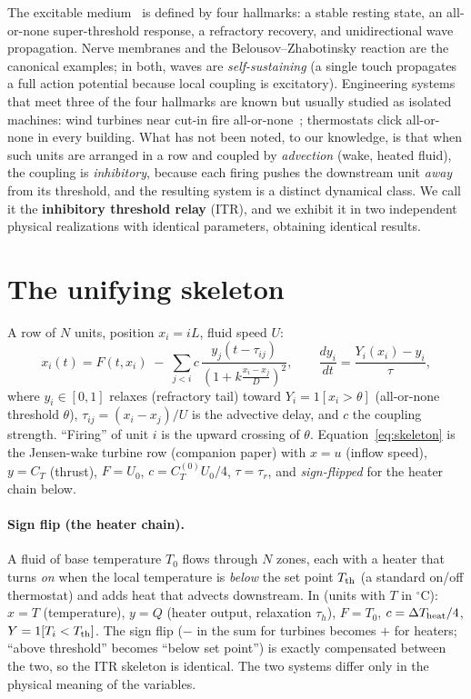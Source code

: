 \documentclass[11pt]{article}
\begin{document}
The excitable medium~\cite{HodgkinHuxley1952,FitzHugh1961} is defined by four hallmarks: a
stable resting state, an all-or-none super-threshold response, a refractory recovery, and
unidirectional wave propagation. Nerve membranes and the Belousov--Zhabotinsky reaction are
the canonical examples; in both, waves are \emph{self-sustaining} (a single touch propagates
a full action potential because local coupling is excitatory). Engineering systems that meet
three of the four hallmarks are known but usually studied as isolated machines: wind turbines
near cut-in fire all-or-none~\cite{Howland2019}; thermostats click all-or-none in every
building. What has not been noted, to our knowledge, is that when such units are arranged in
a row and coupled by \emph{advection} (wake, heated fluid), the coupling is
\emph{inhibitory}, because each firing pushes the downstream unit \emph{away} from its threshold, and the resulting system is a distinct dynamical class. We call it the
\textbf{inhibitory threshold relay} (ITR), and we exhibit it in two independent physical
realizations with identical parameters, obtaining identical results.

\section{The unifying skeleton}

A row of $N$ units, position $x_i=iL$, fluid speed $U$:
\begin{equation}
x_i(t) = F(t,x_i) \;-\; \sum_{j<i} c\,\frac{y_j\!\left(t-\tau_{ij}\right)}{\left(1+k\frac{x_i-x_j}{D}\right)^2},
\qquad \frac{dy_i}{dt} = \frac{Y_i(x_i)-y_i}{\tau},
\label{eq:skeleton}
\end{equation}
where $y_i \in [0,1]$ relaxes (refractory tail) toward $Y_i = 1[x_i > \theta]$ (all-or-none
threshold $\theta$), $\tau_{ij}=(x_i-x_j)/U$ is the advective delay, and $c$ the coupling
strength. ``Firing'' of unit $i$ is the upward crossing of $\theta$. Equation~\eqref{eq:skeleton}
is the Jensen-wake turbine row (companion paper) with $x=u$ (inflow speed), $y=C_T$ (thrust),
$F = U_0$, $c = C_T^{(0)}U_0/4$, $\tau = \tau_r$, and \emph{sign-flipped} for the heater
chain below.

\paragraph{Sign flip (the heater chain).} A fluid of base temperature $T_0$ flows through
$N$ zones, each with a heater that turns \emph{on} when the local temperature is \emph{below}
the set point $T_{\rm th}$ (a standard on/off thermostat) and adds heat that advects
downstream. In (units with $T$ in $^\circ$C): $x = T$ (temperature), $y = Q$ (heater output,
relaxation $\tau_h$), $F = T_0$, $c = \Delta T_{\rm heat}/4$, $Y = 1[T_i < T_{\rm th}]$.
The sign flip ($-$ in the sum for turbines becomes $+$ for heaters; ``above threshold''
becomes ``below set point'') is exactly compensated between the two, so the ITR skeleton is
identical. The two systems differ only in the physical meaning of the variables.
\end{document}
